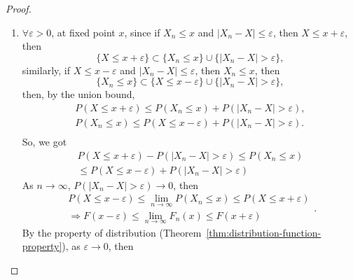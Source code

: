\begin{proof}
	\begin{enumerate}
		\item \(\forall\varepsilon>0\), at fixed point \(x\), since if \(X_n\leq x\) and \(|X_n-X|\leq\varepsilon\), then \(X\leq x+\varepsilon\), then
		      \begin{equation*}
			      \{X\leq x+\varepsilon\}\subset\{X_n\leq x\}\cup\{|X_n-X|>\varepsilon\},
		      \end{equation*}
		      similarly, if \(X\leq x-\varepsilon\) and \(|X_n-X|\leq\varepsilon\), then \(X_n\leq x\), then
		      \begin{equation*}
			      \{X_n\leq x\}\subset\{X\leq x-\varepsilon\}\cup\{|X_n-X|>\varepsilon\},
		      \end{equation*}
		      then, by the union bound,
		      \begin{equation*}
			      \begin{gathered}
				      P\left(X\leq x+\varepsilon\right)\leq P\left(X_n\leq x\right)+P\left(|X_n-X|>\varepsilon\right),\\
				      P\left(X_n\leq x\right)\leq P\left(X\leq x-\varepsilon\right)+P\left(|X_n-X|>\varepsilon\right).\\
			      \end{gathered}
		      \end{equation*}
		      So, we got
		      \begin{equation*}
			      \begin{gathered}
				      P\left(X\leq x+\varepsilon\right)-P\left(|X_n-X|>\varepsilon\right)\leq P\left(X_n\leq x\right) \\
				      \leq P\left(X\leq x-\varepsilon\right)+P\left(|X_n-X|>\varepsilon\right)
			      \end{gathered}
		      \end{equation*}
		      As \(n\rightarrow\infty\), \(P\left(|X_n-X|>\varepsilon\right)\rightarrow 0\), then
		      \begin{equation*}
			      \begin{gathered}
				      P\left(X\leq x-\varepsilon\right)\leq\lim_{n\rightarrow\infty}P\left(X_n\leq x\right)\leq P\left(X\leq x+\varepsilon\right) \\
				      \Rightarrow F(x-\varepsilon)\leq \lim_{n\rightarrow\infty}F_n(x)\leq F(x+\varepsilon)
			      \end{gathered}.
		      \end{equation*}
		      By the property of distribution (Theorem~\ref{thm:distribution-function-property}), as \(\varepsilon\rightarrow 0\), then

\end{enumerate}
\end{proof}
